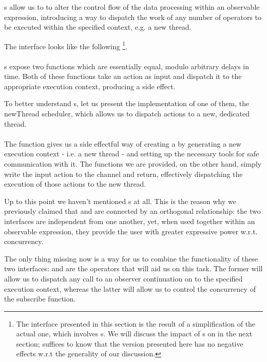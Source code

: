 s allow us to to alter the control flow of the data processing within an observable expression, introducing a way to dispatch the work of any number of operators to be executed within the specified context, e.g. a new thread.

The  interface looks like the following \footnote{The interface presented in this section is the result of a simplification of the actual one, which involves s. We will discuss the impact of s on  in the next section; suffices to know that the version presented here has no negative effects w.r.t the generality of our discussion.}.\\

\\

s expose two functions which are essentially equal, modulo arbitrary delays in time. Both of these functions take an  action as input and dispatch it to the appropriate execution context, producing a side effect. 

To better understand s, let us present the implementation of one of them, the newThread scheduler, which allows us to dispatch actions to a new, dedicated thread.\\

\\

The  function gives us a side effectful way of creating a  by generating a new execution context - i.e. a new thread - and setting up the necessary tools for safe communication with it. The  functions we are provided, on the other hand, simply write the input  action to the channel and return, effectively dispatching the execution of those actions to the new thread. 

Up to this point we haven't mentioned s at all. This is the reason why we previously claimed that  and  are connected by an orthogonal relationship: the two interfaces are independent from one another, yet, when used together within an observable expression, they provide the user with greater expressive power w.r.t. concurrency. 

The only thing missing now is a way for us to combine the functionality of these two interfaces:  and  are the operators that will aid us on this task. The former will allow us to dispatch any call to an observer continuation on to the specified execution context, whereas the latter will allow us to control the concurrency of the  subscribe function.

